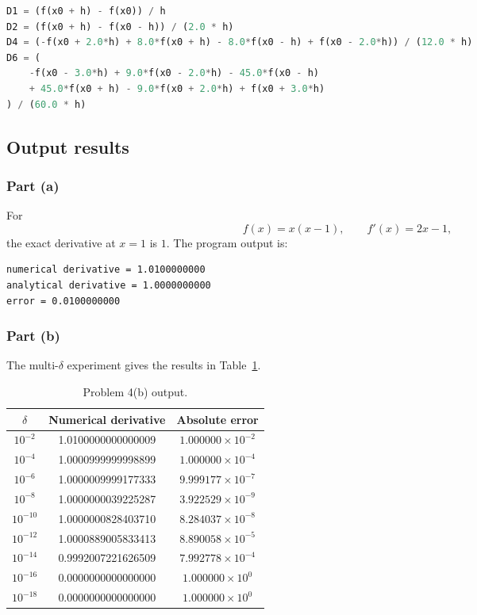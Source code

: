 \documentclass[12pt,a4paper]{article}
\begin{document}
\begin{lstlisting}[language=Python,caption={High-order comparison from hw7\_4/c++.py.}]
D1 = (f(x0 + h) - f(x0)) / h
D2 = (f(x0 + h) - f(x0 - h)) / (2.0 * h)
D4 = (-f(x0 + 2.0*h) + 8.0*f(x0 + h) - 8.0*f(x0 - h) + f(x0 - 2.0*h)) / (12.0 * h)
D6 = (
    -f(x0 - 3.0*h) + 9.0*f(x0 - 2.0*h) - 45.0*f(x0 - h)
    + 45.0*f(x0 + h) - 9.0*f(x0 + 2.0*h) + f(x0 + 3.0*h)
) / (60.0 * h)
\end{lstlisting}

\subsection{Output results}

\subsubsection{Part (a)}

For
\[
f(x)=x(x-1), \qquad f'(x)=2x-1,
\]
the exact derivative at $x=1$ is $1$. The program output is:

\begin{lstlisting}
numerical derivative = 1.0100000000
analytical derivative = 1.0000000000
error = 0.0100000000
\end{lstlisting}

\subsubsection{Part (b)}

The multi-$\delta$ experiment gives the results in Table~\ref{tab:p4b}.

\begin{table}[H]
\centering
\caption{Problem 4(b) output.}
\label{tab:p4b}
\begin{tabular}{ccc}
\toprule
$\delta$ & Numerical derivative & Absolute error \\
\midrule
$10^{-2}$ & 1.0100000000000009 & $1.000000\times 10^{-2}$ \\
$10^{-4}$ & 1.0000999999998899 & $1.000000\times 10^{-4}$ \\
$10^{-6}$ & 1.0000009999177333 & $9.999177\times 10^{-7}$ \\
$10^{-8}$ & 1.0000000039225287 & $3.922529\times 10^{-9}$ \\
$10^{-10}$ & 1.0000000828403710 & $8.284037\times 10^{-8}$ \\
$10^{-12}$ & 1.0000889005833413 & $8.890058\times 10^{-5}$ \\
$10^{-14}$ & 0.9992007221626509 & $7.992778\times 10^{-4}$ \\
$10^{-16}$ & 0.0000000000000000 & $1.000000\times 10^{0}$ \\
$10^{-18}$ & 0.0000000000000000 & $1.000000\times 10^{0}$ \\
\bottomrule
\end{tabular}
\end{table}
\end{document}

